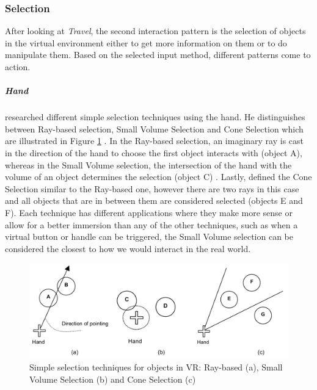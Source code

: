 
\subsubsection{Selection}

After looking at \textit{Travel}, the second interaction pattern is the selection of objects in the virtual environment either to get more information on them or to do manipulate them. Based on the selected input method, different patterns come to action.

\subparagraph{Hand}

\cite{Steed2006} researched different simple selection techniques using the hand. He distinguishes between Ray-based selection, Small Volume Selection and Cone Selection which are illustrated in Figure \ref{fig:selectiontechniques} \citep{Steed2006}. In the Ray-based selection, an imaginary ray is cast in the direction of the hand to choose the first object interacts with (object A), whereas in the Small Volume selection, the intersection of the hand with the volume of an object determines the selection (object C) \citep{Steed2006}. Lastly, \cite{Steed2006} defined the Cone Selection similar to the Ray-based one, however there are two rays in this case and all objects that are in between them are considered selected (objects E and F). \newline
Each technique has different applications where they make more sense or allow for a better immersion than any of the other techniques, such as when a virtual button or handle can be triggered, the Small Volume selection can be considered the closest to how we would interact in the real world.
\begin{figure}[h]
	\begin{center}
		\includegraphics[width=14cm]{03_Figures/05_LitReview/Steed2006_SelectionTechniques.png}
		\caption[Simple selection techniques for objects in VR: Ray-based, Small Volume Selection and Cone Selection]{Simple selection techniques for objects in VR: Ray-based (a), Small Volume Selection (b) and Cone Selection (c) \citep{Steed2006}}
		\label{fig:selectiontechniques}
	\end{center}
\end{figure}


